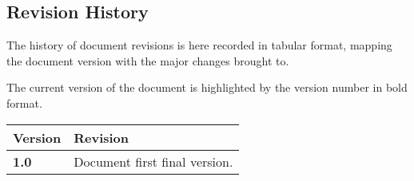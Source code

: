 \subsection{Revision History}

The history of document revisions is here recorded in tabular format, mapping the document version with the major changes brought to.

The current version of the document is highlighted by the version number in bold format.

\begin{longtable}{ |l|p{7cm}| }
	\hline
	\textbf{Version} & \textbf{Revision}\\ \hline
	\textbf{1.0} & Document first final version.\\ \hline
\end{longtable}
